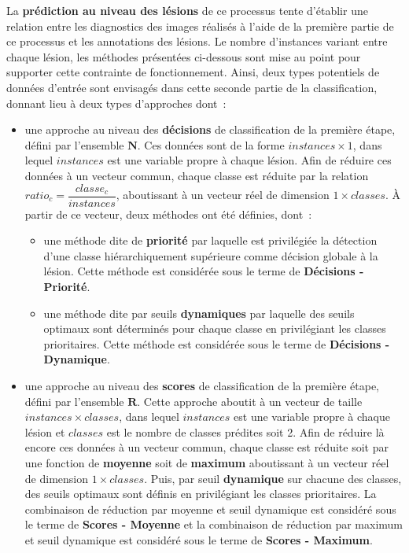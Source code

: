 La \textbf{prédiction au niveau des lésions} de ce processus tente d'établir une relation entre les diagnostics des images réalisés à l'aide de la première partie de ce processus et les annotations des lésions. Le nombre d'instances variant entre chaque lésion, les méthodes présentées ci-dessous sont mise au point pour supporter cette contrainte de fonctionnement. Ainsi, deux types potentiels de données d'entrée sont envisagés dans cette seconde partie de la classification, donnant lieu à deux types d'approches dont~:
\begin{itemize}
    \item   une approche au niveau des \textbf{décisions} de classification de la première étape, défini par l'ensemble $\mathbf{N}$. Ces données sont de la forme $instances \times 1$, dans lequel $instances$ est une variable propre à chaque lésion. Afin de réduire ces données à un vecteur commun, chaque classe est réduite par la relation $ratio_c = \dfrac{classe_c}{instances}$, aboutissant à un vecteur réel de dimension $1 \times classes$. À partir de ce vecteur, deux méthodes ont été définies, dont~:
            \begin{itemize}
                \item une méthode dite de \textbf{priorité} par laquelle est privilégiée la détection d'une classe hiérarchiquement supérieure comme décision globale à la lésion. Cette méthode est considérée sous le terme de \textbf{Décisions - Priorité}.
                \item une méthode dite par seuils \textbf{dynamiques} par laquelle des seuils optimaux sont déterminés pour chaque classe en privilégiant les classes prioritaires. Cette méthode est considérée sous le terme de \textbf{Décisions - Dynamique}.
            \end{itemize}
    \item   une approche au niveau des \textbf{scores} de classification de la première étape, défini par l'ensemble $\mathbf{R}$. Cette approche aboutit à un vecteur de taille $instances \times classes$, dans lequel $instances$ est une variable propre à chaque lésion et $classes$ est le nombre de classes prédites soit 2. Afin de réduire là encore ces données à un vecteur commun, chaque classe est réduite soit par une fonction de \textbf{moyenne} soit de \textbf{maximum} aboutissant à un vecteur réel de dimension $1 \times classes$. Puis, par seuil \textbf{dynamique} sur chacune des classes, des seuils optimaux sont définis en privilégiant les classes prioritaires. La combinaison de réduction par moyenne et seuil dynamique est considéré sous le terme de \textbf{Scores - Moyenne} et la combinaison de réduction par maximum et seuil dynamique est considéré sous le terme de  \textbf{Scores - Maximum}.
\end{itemize}\par
\clearpage

